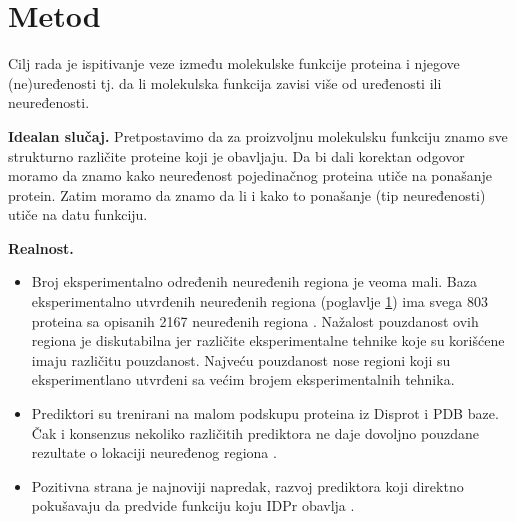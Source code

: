 \section {Metod}

Cilj rada je ispitivanje veze između molekulske funkcije proteina i njegove
(ne)uređenosti tj. da li molekulska funkcija zavisi više od uređenosti ili
neuređenosti.

\textbf{Idealan slučaj.} 
Pretpostavimo da za proizvoljnu molekulsku funkciju znamo sve strukturno različite
proteine koji je obavljaju.  Da bi dali korektan odgovor  moramo da znamo kako
neuređenost pojedinačnog proteina utiče na ponašanje protein.  Zatim moramo da
znamo da li i kako to ponašanje (tip neuređenosti) utiče na datu funkciju.

\textbf{Realnost.} 
\begin{itemize}
  \item Broj eksperimentalno određenih neuređenih regiona je veoma mali.
    Baza eksperimentalno utvrđenih neuređenih regiona  (poglavlje \ref{}) ima
    svega 803 proteina sa opisanih 2167 neuređenih regiona \parencite{disprot7}.
    Nažalost pouzdanost ovih regiona je diskutabilna jer različite
    eksperimentalne tehnike koje su korišćene imaju različitu pouzdanost.
    Najveću pouzdanost nose regioni koji su eksperimentlano utvrđeni sa 
    većim brojem eksperimentalnih tehnika.
  \item Prediktori su trenirani na malom podskupu proteina iz Disprot i PDB  baze.
    Čak i konsenzus nekoliko različitih prediktora ne daje dovoljno pouzdane
    rezultate o lokaciji neuređenog regiona \parencite{Mitic}.
  \item 
    Pozitivna strana je najnoviji napredak, razvoj prediktora koji direktno
    pokušavaju da predvide funkciju koju IDPr obavlja \parencite{meng_c20017}.

\end{itemize}

